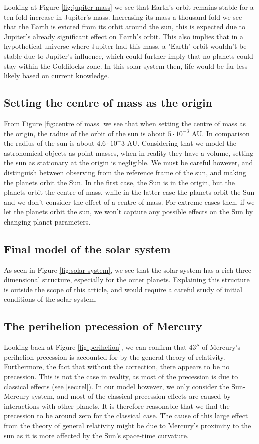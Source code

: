 Looking at Figure \ref{fig:jupiter mass} we see that Earth's orbit remains stable for a
ten-fold increase in Jupiter's mass. Increasing its mass a thousand-fold we see
that the Earth is evicted from its orbit around the sun, this is expected due to
Jupiter's already significant effect on Earth's orbit. This also implies that in a hypothetical universe where Jupiter had this mass, a "Earth"-orbit wouldn't be stable due to Jupiter's influence, which could further imply that no planets could stay within the Goldilocks zone. In this solar system then, life would be far less likely based on current knowledge.

\subsection{Setting the centre of mass as the origin}
From Figure \ref{fig:centre of mass} we see that when setting the centre of mass as the origin, the radius of the orbit of the sun is about $5\cdot 10^{-3}$ AU. In comparison the radius of the sun is about $4.6\cdot 10^-3{}$ AU. Considering that we model the astronomical objects as point masses, when in reality they have a volume, setting the sun as stationary at the origin is negligible. We must be careful however, and distinguish between observing from the reference frame of the sun, and making the planets orbit the Sun. In the first case, the Sun is in the origin, but the planets orbit the centre of mass, while in the latter case the planets orbit the Sun and we don't consider the effect of a centre of mass. For extreme cases then, if we let the planets orbit the sun, we won't capture any possible effects on the Sun by changing planet parameters.

\subsection{Final model of the solar system}
As seen in Figure \ref{fig:solar system}, we see that the solar system has a rich
three dimensional structure, especially for the outer planets. Explaining this structure is outside the scope of this article, and would require a careful study of initial conditions of the solar system.


\subsection{The perihelion precession of Mercury}
Looking back at Figure \ref{fig:perihelion}, we can confirm that $43''$ of Mercury's perihelion
precession is accounted for by the general theory of relativity. Furthermore, the fact that without the correction, there
appears to be no precession. This is not the case in reality, as most of the precession is due to classical effects (see \ref{sec:rel}). In our model however, we only consider the Sun-Mercury system, and most of the classical precession effects are caused by interactions with other planets. It is therefore reasonable that we find the precession to be around zero for the classical case. The cause of this large effect from the theory of general relativity might be due to Mercury's proximity to the sun as it is more affected by the Sun's space-time curvature.

